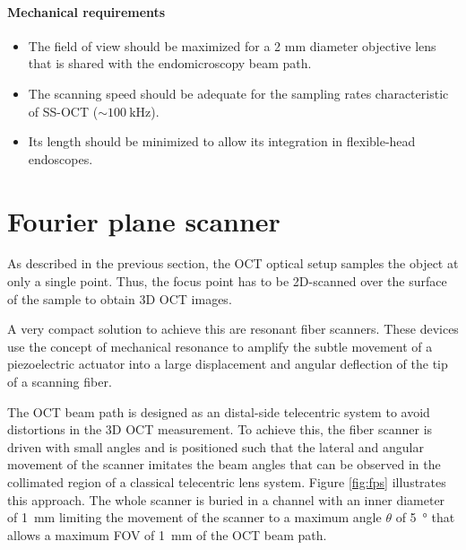 \documentclass[10pt]{iopart}
\begin{document}
\paragraph{Mechanical requirements}
\begin{itemize}
\item The field of view should be maximized for a 2 mm diameter objective lens that is shared with the endomicroscopy beam path.
\item The scanning speed should be adequate for the sampling rates characteristic of SS-OCT ($\sim \SI{100}{\kilo\hertz} $).
\item Its length should be minimized to allow its integration in flexible-head endoscopes.
\end{itemize}


\section{Fourier plane scanner}
As described in the previous section, the OCT optical setup samples the object at only a single point. Thus, the focus point has to be 2D-scanned over the surface of the sample to obtain 3D OCT images.

A very compact solution to achieve this are resonant fiber scanners. These devices use the concept of mechanical resonance to amplify the subtle movement of a piezoelectric actuator into a large displacement and angular deflection of the tip of a scanning fiber. 

The OCT beam path is designed as an distal-side telecentric system to avoid distortions in the 3D OCT measurement. To achieve this, the fiber scanner is driven with small angles and is positioned such that the lateral and angular movement of the scanner imitates the beam angles that can be observed in the collimated region of a classical telecentric lens system. Figure \ref{fig:fps} illustrates this approach. The whole scanner is buried in a channel with an inner diameter of \SI{1}{\milli\meter} limiting the movement of the scanner to a maximum angle $\theta$ of \SI{5}{\degree} that allows a maximum FOV of \SI{1}{\milli\meter} of the OCT beam path.
\end{document}
